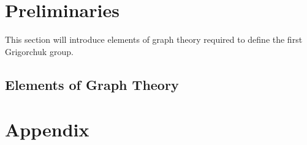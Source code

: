 
\allowdisplaybreaks

%

\chapter{Preliminaries}
This section will introduce  elements of graph theory required to define the first Grigorchuk group.
\section{Elements of  Graph Theory}


%
%
%
%
%
%
%
%
%

\clearpage
\chapter{Appendix}\label{sec:Appendix}


\vspace{\fill}
\printbibliography[heading=subbibliography]